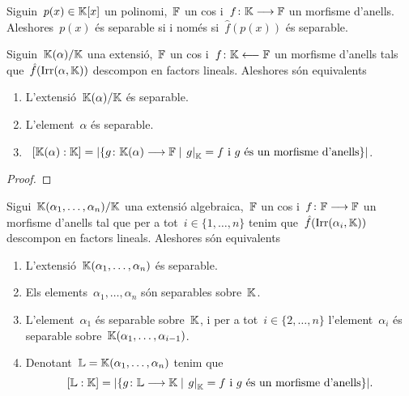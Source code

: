 \documentclass[../../Main.tex]{subfiles}
\begin{document}
	\begin{lemma}
		\label{lema:un polinomi és separable si i només si ho és adaptant els coeficients}
		Siguin~\(p(x)\in\mathbb{K}[x]\) un polinomi,~\(\mathbb{F}\) un cos i~\(f\colon\mathbb{K}\longrightarrow\mathbb{F}\) un morfisme d'anells.
		Aleshores~\(p(x)\) és separable si i només si~\(\hat{f}(p(x))\) és separable.	
	\end{lemma}
	\begin{lemma}
		\label{lema:condicions pel nombre d'extensions de morfismes}
		Siguin~\(\mathbb{K}(\alpha)/\mathbb{K}\) una extensió,~\(\mathbb{F}\) un cos i~\(f\colon\mathbb{K}\longleftarrow\mathbb{F}\) un morfisme d'anells tals que~\(\hat{f}(\operatorname{Irr}(\alpha,\mathbb{K}))\) descompon en factors lineals.
		Aleshores són equivalents
		\begin{enumerate}
			\item\label{lema:condicions pel nombre d'extensions de morfismes:eq1} L'extensió~\(\mathbb{K}(\alpha)/\mathbb{K}\) és separable.
			\item\label{lema:condicions pel nombre d'extensions de morfismes:eq2} L'element~\(\alpha\) és separable.
			\item\label{lema:condicions pel nombre d'extensions de morfismes:eq3}~\(\grauExtensio{\KK(\alpha)}{\KK}=\card{\{g\colon\KK(\alpha)\longrightarrow\FF\mid\left.g\right|_{\KK}=f\text{ i }g\text{ és un morfisme d'anells}\}}\).
		\end{enumerate}
		\begin{proof}
		\end{proof}
	\end{lemma}
	\begin{theorem}
		\label{thm:Teorema de separabilitat}
		Sigui~\(\mathbb{K}(\alpha_{1},\dots,\alpha_{n})/\mathbb{K}\) una extensió algebraica,~\(\mathbb{F}\) un cos i~\(f\colon\mathbb{F}\longrightarrow\mathbb{F}\) un morfisme d'anells tal que per a tot~\(i\in\{1,\dots,n\}\) tenim que~\(\hat{f}(\operatorname{Irr}(\alpha_{i},\mathbb{K}))\) descompon en factors lineals.
		Aleshores són equivalents
		\begin{enumerate}
			\item L'extensió~\(\mathbb{K}(\alpha_{1},\dots,\alpha_{n})\) és separable.
			\item Els elements~\(\alpha_{1},\dots,\alpha_{n}\) són separables sobre~\(\mathbb{K}\).
			\item L'element~\(\alpha_{1}\) és separable sobre~\(\mathbb{K}\), i per a tot~\(i\in\{2,\dots,n\}\) l'element~\(\alpha_{i}\) és separable sobre~\(\mathbb{K}(\alpha_{1},\dots,\alpha_{i-1})\).
				\item Denotant~\(\mathbb{L}=\mathbb{K}(\alpha_{1},\dots,\alpha_{n})\) tenim que
				\[
				    \grauExtensio{\LL}{\KK}=\card{\{g\colon\LL\longrightarrow\KK\mid\left.g\right|_{\KK}=f\text{ i }g\text{ és un morfisme d'anells}\}}.
				\]
		\end{enumerate}
	\end{theorem}
\end{document}
